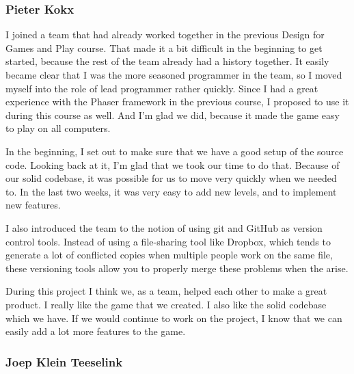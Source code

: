 \documentclass[a4paper,twoside,12pt]{article}
\begin{document}
\subsubsection{Pieter Kokx}

I joined a team that had already worked together in the previous Design for
Games and Play course. That made it a bit difficult in the beginning to get
started, because the rest of the team already had a history together. It
easily became clear that I was the more seasoned programmer in the team, so I
moved myself into the role of lead programmer rather quickly. Since I had a
great experience with the Phaser framework in the previous course, I proposed
to use it during this course as well. And I'm glad we did, because it made the
game easy to play on all computers.

In the beginning, I set out to make sure that we have a good setup of the
source code. Looking back at it, I'm glad that we took our time to do that.
Because of our solid codebase, it was possible for us to move very quickly
when we needed to. In the last two weeks, it was very easy to add new levels,
and to implement new features.

I also introduced the team to the notion of using git and GitHub as version
control tools. Instead of using a file-sharing tool like Dropbox, which tends
to generate a lot of conflicted copies when multiple people work on the same
file, these versioning tools allow you to properly merge these problems when
the arise.

During this project I think we, as a team, helped each other to make a great
product. I really like the game that we created. I also like the solid
codebase which we have. If we would continue to work on the project, I know
that we can easily add a lot more features to the game.


\subsubsection{Joep Klein Teeselink}
\end{document}
